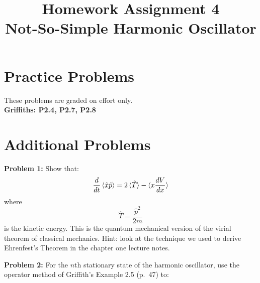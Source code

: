 \documentclass[12pt]{article}
\begin{document}
\newcommand{\ihbar}{\ensuremath{i \hbar}}
\newcommand{\dPsidt}{\ensuremath{ \frac{\partial \Psi}{\partial t} }}
\newcommand{\dPsidx}{\ensuremath{ \frac{\partial \Psi}{\partial x} }}
\newcommand{\ddPsidx}{\ensuremath{ \frac{\partial^2 \Psi}{\partial x^2} }}
\newcommand{\dPssdt}{\ensuremath{ \frac{\partial \Psi^*}{\partial t} }}
\newcommand{\dPssdx}{\ensuremath{ \frac{\partial \Psi^*}{\partial x} }}
\newcommand{\ddPssdx}{\ensuremath{ \frac{\partial^2 \Psi^*}{\partial x^2} }}

\newcommand{\dphidt}{\ensuremath{ \frac{d \phi}{dt} }}
\newcommand{\dpsidx}{\ensuremath{ \frac{d \psi}{dx} }}
\newcommand{\ddpsidx}{\ensuremath{ \frac{d^2 \psi}{dx^2} }}


\date{\vspace{-5ex}}

\title{Homework Assignment 4 \\ Not-So-Simple Harmonic Oscillator}

\maketitle

\section*{Practice Problems}

These problems are graded on effort only.\\

\noindent
{\bf Griffiths: P2.4, P2.7, P2.8} \\

\section*{Additional Problems}

\noindent
{\bf Problem 1:} Show that:
$$\frac{d}{dt}\braket{\hat{x}\hat{p}} = 2\braket{\hat{T}} - \braket{x \frac{dV}{dx}}$$
where
$$\hat{T} = \frac{\hat{p}^2}{2m}$$
is the kinetic energy.  This is the quantum mechanical version of the virial theorem of classical mechanics.  Hint: look at the technique we used to derive Ehrenfest's Theorem in the chapter one lecture notes.\\

\vskip 2cm

\noindent
{\bf Problem 2:} For the $n$th stationary state of the harmonic oscillator, use the operator method of Griffith's Example 2.5 (p.~47) to:\\
\end{document}
